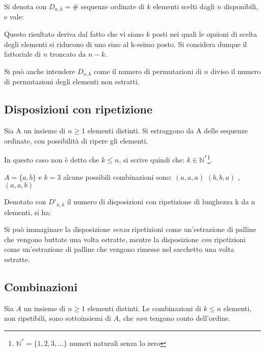 Si denota con \(D_{n,k}=\#\) sequenze ordinate di \(k\) elementi scelti dagli \(n\) disponibili, e vale:
\begin{center}
\end{center}

Questo risultato deriva dal fatto che vi siano \(k\) posti nei quali le opzioni di scelta degli elementi si riducono di uno sino al k-esimo posto. Si considera dunque il fattoriale di \(n\) troncato da \(n-k\).

Si può anche intendere \(D_{n,k}\) come il numero di permutazioni di \(n\) diviso il numero di permutazioni degli elementi non estratti.
\subsection{Disposizioni con ripetizione}
Sia A un insieme di \(n\geq1\) elementi distinti. Si estraggono da A delle sequenze ordinate, con possibilità di ripere gli elementi.

In questo caso non è detto che \(k\leq n\), si scrive quindi che: \(k\in \mathbb{N}^*\)\footnote{\(\mathbb{N}^*=\{ 1,2,3,...\}\) numeri naturali senza lo zero}.
\vspace{5px}
\begin{example}
\(A=\{ a,b\}\) e \(k=3\) alcune possibili combinazioni sono: \((a,a,a)\)  \((b,b,a)\) , \((a,a,b)\)
\end{example}
\vspace{10px}
Denotato con \(D'_{n,k}\) il numero di disposizioni con ripetizione di lunghezza k da n elementi, si ha:
\begin{center}
\end{center}
\vspace{10px}
\begin{observation}
Si può immaginare la disposizione \textit{senza} ripetizioni come un'estrazione di palline che vengono buttate una volta estratte, mentre la disposizione \textit{con} ripetizioni come un'estrazione di palline che vengono rimesse nel sacchetto una volta estratte.
\end{observation}

\subsection{Combinazioni}
Sia \(A\) un insieme di \(n\geq 1\) elementi distinti.
\newline
Le combinazioni di \(k\leq n\) elementi, non ripetibili, sono sottoinsiemi di \(A\), che \textit{non} tengono conto dell'ordine.

